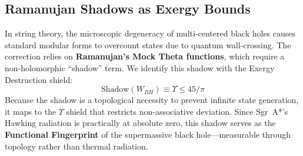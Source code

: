 \subsection{Ramanujan Shadows as Exergy Bounds}

In string theory, the microscopic degeneracy of multi-centered black holes causes standard modular forms to overcount states due to quantum wall-crossing. The correction relies on \textbf{Ramanujan's Mock Theta functions}, which require a non-holomorphic ``shadow'' term. We identify this shadow with the Exergy Destruction shield:
\begin{equation}
    \text{Shadow}(W_{BH}) \equiv \Upsilon \leq 45/\pi
\end{equation}
Because the shadow is a topological necessity to prevent infinite state generation, it maps to the $\Upsilon$ shield that restricts non-associative deviation. Since Sgr~A*'s Hawking radiation is practically at absolute zero, this shadow serves as the \textbf{Functional Fingerprint} of the supermassive black hole---measurable through topology rather than thermal radiation.

